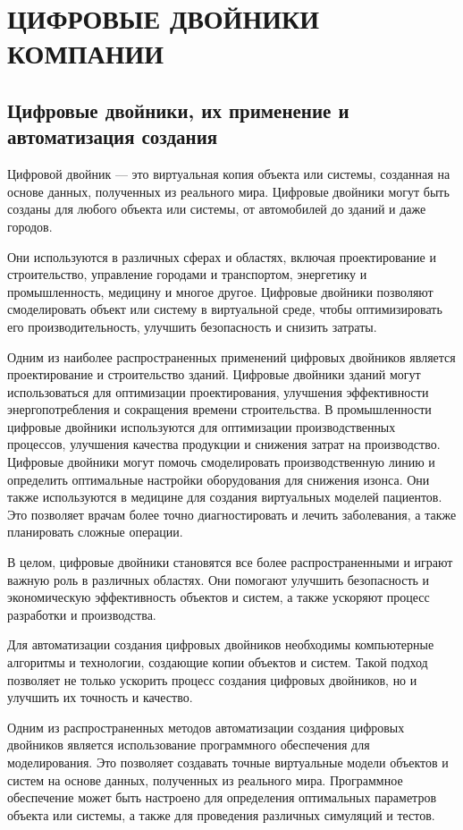 \section{ЦИФРОВЫЕ ДВОЙНИКИ КОМПАНИИ}

\subsection{Цифровые двойники, их применение и автоматизация создания}

Цифровой двойник --- это виртуальная копия объекта или системы, созданная на основе данных, полученных из реального мира. Цифровые двойники могут быть созданы для любого объекта или системы, от автомобилей до зданий и даже городов.

Они используются в различных сферах и областях, включая проектирование и строительство, управление городами и транспортом, энергетику и промышленность, медицину и многое другое. Цифровые двойники позволяют смоделировать объект или систему в виртуальной среде, чтобы оптимизировать его производительность, улучшить безопасность и снизить затраты.

Одним из наиболее распространенных применений цифровых двойников является проектирование и строительство зданий. Цифровые двойники зданий могут использоваться для оптимизации проектирования, улучшения эффективности энергопотребления и сокращения времени строительства. В промышленности цифровые двойники используются для оптимизации производственных процессов, улучшения качества продукции и снижения затрат на производство. Цифровые двойники могут помочь смоделировать производственную линию и определить оптимальные настройки оборудования для снижения изонса. Они также используются в медицине для создания виртуальных моделей пациентов. Это позволяет врачам более точно диагностировать и лечить заболевания, а также планировать сложные операции.

В целом, цифровые двойники становятся все более распространенными и играют важную роль в различных областях. Они помогают улучшить безопасность и экономическую эффективность объектов и систем, а также ускоряют процесс разработки и производства.

Для автоматизации создания цифровых двойников необходимы компьютерные алгоритмы и технологии, создающие копии объектов и систем. Такой подход позволяет не только ускорить процесс создания цифровых двойников, но и улучшить их точность и качество.

Одним из распространенных методов автоматизации создания цифровых двойников является использование программного обеспечения для моделирования. Это позволяет создавать точные виртуальные модели объектов и систем на основе данных, полученных из реального мира. Программное обеспечение может быть настроено для определения оптимальных параметров объекта или системы, а также для проведения различных симуляций и тестов.

